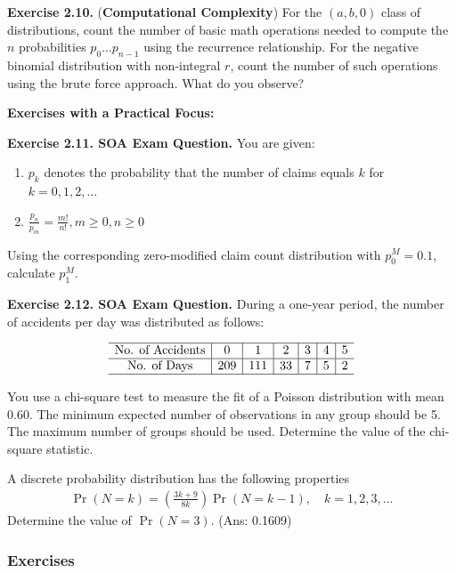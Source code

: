 \documentclass[]{book}
\providecommand{\tightlist}{%
  \setlength{\itemsep}{0pt}\setlength{\parskip}{0pt}}
\theoremstyle{definition}
\theoremstyle{definition}
\theoremstyle{definition}
\theoremstyle{remark}
\begin{document}
\textbf{Exercise 2.10.} (\textbf{Computational Complexity}) For the
\((a,b,0)\) class of distributions, count the number of basic math
operations needed to compute the \(n\) probabilities
\(p_0\ldots p_{n-1}\) using the recurrence relationship. For the
negative binomial distribution with non-integral \(r\), count the number
of such operations using the brute force approach. What do you observe?

\textbf{Exercises with a Practical Focus:}

\textbf{Exercise 2.11. SOA Exam Question.} You are given:

\begin{enumerate}
\def\labelenumi{\arabic{enumi}.}
\tightlist
\item
  \(p_k\) denotes the probability that the number of claims equals \(k\)
  for \(k=0,1,2,\ldots\)
\item
  \(\frac{p_n}{p_m}=\frac{m!}{n!}, m\ge 0, n\ge 0\)
\end{enumerate}

Using the corresponding zero-modified claim count distribution with
\(p_0^M=0.1\), calculate \(p_1^M\).

\textbf{Exercise 2.12. SOA Exam Question.} During a one-year period, the
number of accidents per day was distributed as follows:

\[
\begin{matrix}
\begin{array}{c|c|c|c|c|c|c}
\hline
\text{No. of Accidents} & 0 & 1 & 2 & 3 & 4 & 5\\
\hline
\text{No. of Days} & 209 & 111 & 33 & 7 & 5 & 2\\
\hline
\end{array}
\end{matrix}
\]

You use a chi-square test to measure the fit of a Poisson distribution
with mean 0.60. The minimum expected number of observations in any group
should be 5. The maximum number of groups should be used. Determine the
value of the chi-square statistic.

A discrete probability distribution has the following properties \[
\begin{aligned}
\Pr(N=k) = \left( \frac{3k+9}{8k}\right) \Pr(N=k-1), \quad k=1,2,3,\ldots
\end{aligned}
\] Determine the value of \(\Pr(N=3)\). (Ans: 0.1609)

\subsubsection*{Exercises}\label{exercises}
\end{document}

